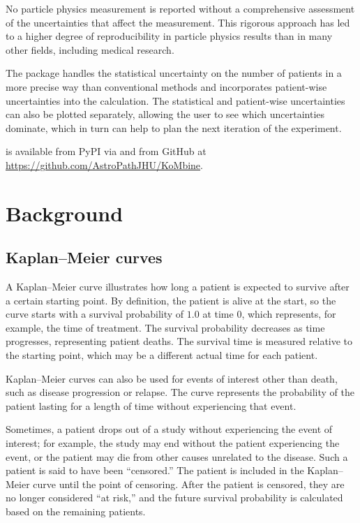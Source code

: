 \documentclass[article]{jss}
\newcommand{\KM}{Kaplan--Meier} %
\begin{document}
No particle physics measurement is reported without a comprehensive assessment of the uncertainties that affect the measurement. This rigorous approach has led to a higher degree of reproducibility in particle physics results than in many other fields, including medical research.

The  package handles the statistical uncertainty on the number of patients in a more precise way than conventional methods and incorporates patient-wise uncertainties into the calculation. The statistical and patient-wise uncertainties can also be plotted separately, allowing the user to see which uncertainties dominate, which in turn can help to plan the next iteration of the experiment.

 is available from PyPI via  and from GitHub at \url{https://github.com/AstroPathJHU/KoMbine}.

\section{Background}\label{sec:background}

\subsection{\KM{} curves}

A \KM{} curve illustrates how long a patient is expected to survive after a certain starting point. By definition, the patient is alive at the start, so the curve starts with a survival probability of \(1.0\) at time \(0\), which represents, for example, the time of treatment. The survival probability decreases as time progresses, representing patient deaths. The survival time is measured relative to the starting point, which may be a different actual time for each patient.

\KM{} curves can also be used for events of interest other than death, such as disease progression or relapse. The curve represents the probability of the patient lasting for a length of time without experiencing that event.

Sometimes, a patient drops out of a study without experiencing the event of interest; for example, the study may end without the patient experiencing the event, or the patient may die from other causes unrelated to the disease. Such a patient is said to have been ``censored.'' The patient is included in the \KM{} curve until the point of censoring. After the patient is censored, they are no longer considered ``at risk,'' and the future survival probability is calculated based on the remaining patients.
\end{document}

